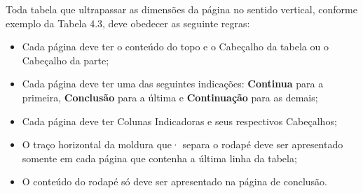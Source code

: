 \newpage
Toda tabela que ultrapassar as dimensões da página no sentido vertical, conforme exemplo da Tabela 4.3, deve obedecer as seguinte regras:

\begin{itemize}
\item [a)] Cada página deve ter o conteúdo do topo e o
Cabeçalho da tabela ou o Cabeçalho da parte;
\item [b)] Cada página deve ter uma das seguintes indicações:
\textbf{Continua} para a primeira, \textbf{Conclusão} para a última e \textbf{Continuação} para as demais;
\item [c)] Cada página deve ter Colunas Indicadoras e seus
respectivos Cabeçalhos;
\item [d)] O traço horizontal da moldura que· separa o rodapé deve ser apresentado somente em cada página que contenha a última linha da tabela;
\item [e)] O conteúdo do rodapé só deve ser apresentado na página de conclusão.
\end{itemize}


